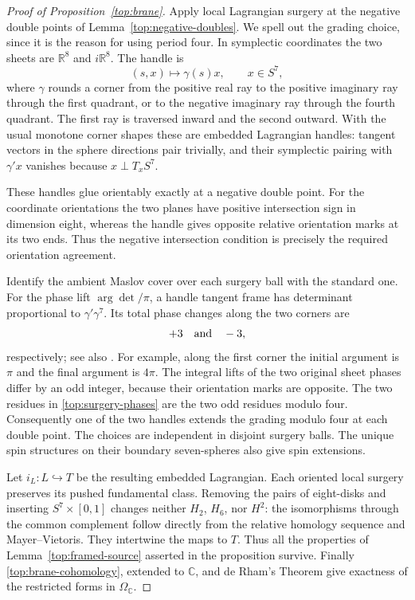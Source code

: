 \documentclass[11pt]{article}
\theoremstyle{definition}
\theoremstyle{remark}
\newcommand{\R}{\mathbb R}
\newcommand{\C}{\mathbb C}
\numberwithin{equation}{section}
\begin{document}
\begin{proof}[Proof of Proposition~\ref{top:brane}]
Apply local Lagrangian surgery at the negative double points
of Lemma~\ref{top:negative-doubles}.  We spell out the
grading choice, since it is the reason for using period four.
In symplectic coordinates the two sheets are
$\R^8$ and $i\R^8$.  The handle is
\[
 (s,x)\longmapsto\gamma(s)x,\qquad x\in S^7,
\]
where $\gamma$ rounds a corner from the positive real ray
to the positive imaginary ray through the first quadrant,
or to the negative imaginary ray through the fourth
quadrant.  The first ray is traversed inward and the second
outward.  With the usual monotone corner shapes these are
embedded Lagrangian handles: tangent vectors in the sphere
directions pair trivially, and their symplectic pairing
with $\gamma' x$ vanishes because $x\perp T_xS^7$.

These handles glue orientably exactly at a negative double
point.  For the coordinate orientations the two planes have
positive intersection sign in dimension eight, whereas
the handle gives opposite relative orientation marks at
its two ends.  Thus the negative intersection condition is
precisely the required orientation agreement.

Identify the ambient Maslov cover over each surgery ball
with the standard one.  For the phase lift $\arg\det/\pi$, a handle tangent frame
has determinant proportional to $\gamma'\gamma^7$.
Its total phase changes along the two corners are
\begin{equation}\label{top:surgery-phases}
 +3\quad\hbox{and}\quad-3,
\end{equation}
respectively; see also \cite[Lemma~2.4]{ekholm-smith}.
For example, along the first corner the initial argument
is $\pi$ and the final argument is $4\pi$.
The integral lifts of the two original sheet phases differ
by an odd integer, because their orientation marks are
opposite.  The two residues in \eqref{top:surgery-phases}
are the two odd residues modulo four.  Consequently one
of the two handles extends the grading modulo four at
each double point.  The choices are independent in
disjoint surgery balls.  The unique spin structures on
their boundary seven-spheres also give spin extensions.

Let $i_L:L\hookrightarrow T$ be the resulting embedded
Lagrangian.  Each oriented local surgery preserves its
pushed fundamental class.  Removing the pairs of
eight-disks and inserting $S^7\times[0,1]$ changes neither
$H_2$, $H_6$, nor $H^2$: the isomorphisms through the
common complement follow directly from the relative
homology sequence and Mayer--Vietoris.  They intertwine
the maps to $T$.  Thus all the properties of
Lemma~\ref{top:framed-source} asserted in the proposition
survive.  Finally \eqref{top:brane-cohomology}, extended
to $\C$, and de Rham's Theorem give exactness of the
restricted forms in $\Omega_{\C}$.
\end{proof}
\end{document}
